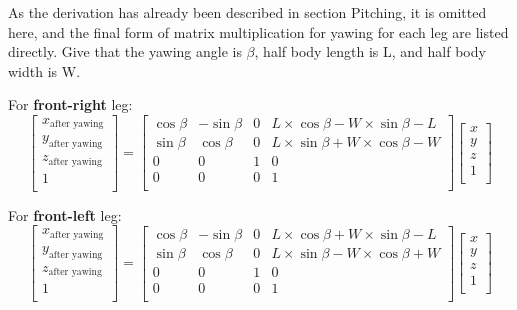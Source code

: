 As the derivation has already been described in section Pitching, it is omitted here, and the final form of matrix multiplication for yawing for each leg are listed directly. Give that the yawing angle is $\beta$, half body length is L, and half body width is W.

For \textbf{front-right} leg:
\begin{equation}
   \begin{bmatrix}
   x_\text{after yawing} \\
   y_\text{after yawing} \\
   z_\text{after yawing} \\
   1                     \\
   \end{bmatrix}
   =
   \begin{bmatrix}
   \cos\beta & -\sin\beta & 0 & L \times \cos\beta - W \times \sin\beta - L \\
   \sin\beta & \cos\beta & 0 & L \times \sin\beta + W \times \cos\beta - W \\
   0 & 0 & 1 & 0 \\
   0 & 0 & 0 & 1 \\
   \end{bmatrix}
   \begin{bmatrix}
   x \\
   y \\
   z \\
   1 \\
   \end{bmatrix}
\end{equation}

For \textbf{front-left} leg:
\begin{equation}
   \begin{bmatrix}
   x_\text{after yawing} \\
   y_\text{after yawing} \\
   z_\text{after yawing} \\
   1                     \\
   \end{bmatrix}
   =
   \begin{bmatrix}
   \cos\beta & -\sin\beta & 0 & L \times \cos\beta + W \times \sin\beta - L \\
   \sin\beta & \cos\beta & 0 & L \times \sin\beta - W \times \cos\beta + W \\
   0 & 0 & 1 & 0 \\
   0 & 0 & 0 & 1 \\
   \end{bmatrix}
   \begin{bmatrix}
   x \\
   y \\
   z \\
   1 \\
   \end{bmatrix}
\end{equation}

